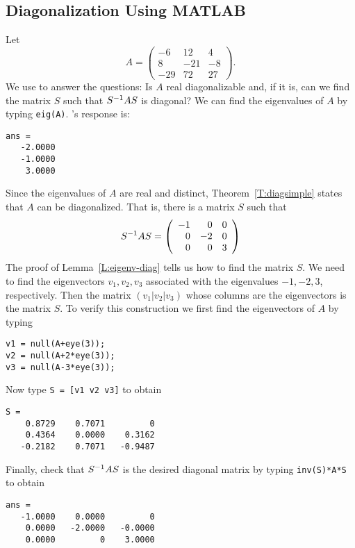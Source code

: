 \documentclass{ximera}
\begin{document}
\subsection*{Diagonalization Using MATLAB}

Let
\begin{equation*}
A= \left( \begin{array}{rrr} -6 & 12 & 4 \\
 8 & -21 & -8 \\
  -29 & 72 & 27 \end{array} \right).
\end{equation*}
We use \Matlab to answer the questions:  Is $A$ real diagonalizable 
and, if it is, can we find the matrix $S$ such that $S^{-1} AS$ is diagonal?
We can find the eigenvalues of $A$ by typing {\tt eig(A)}. \Matlabp's
response is:
\begin{verbatim}
ans =
   -2.0000
   -1.0000
    3.0000
\end{verbatim}
Since the eigenvalues of $A$ are real and distinct, 
Theorem~\ref{T:diagsimple} states that $A$ can be diagonalized.  
That is, there is a matrix $S$ such that 
\[
S^{-1} AS = \left(\begin{array}{rrr} -1 & 0 & 0 \\ 0 & -2 & 0\\
0 & 0 & 3 \end{array}\right)
\]
The proof of Lemma~\ref{L:eigenv-diag} tells us how to find the 
matrix $S$.  We need to find the eigenvectors $v_1,v_2,v_3$ 
associated with the eigenvalues $-1,-2,3$, respectively.  Then 
the matrix $(v_1|v_2|v_3)$ whose columns are the eigenvectors is 
the matrix $S$. To verify this construction we first find the 
eigenvectors of $A$ by typing
\begin{verbatim}
v1 = null(A+eye(3));
v2 = null(A+2*eye(3));
v3 = null(A-3*eye(3));
\end{verbatim} 
Now type {\tt S = [v1 v2 v3]} to obtain
\begin{verbatim}
S =
    0.8729    0.7071         0
    0.4364    0.0000    0.3162
   -0.2182    0.7071   -0.9487
\end{verbatim}
Finally, check that $S^{-1} AS$ is the desired diagonal matrix by 
typing {\tt inv(S)*A*S} to obtain
\begin{verbatim}
ans =
   -1.0000    0.0000         0
    0.0000   -2.0000   -0.0000
    0.0000         0    3.0000
\end{verbatim}
\end{document}
